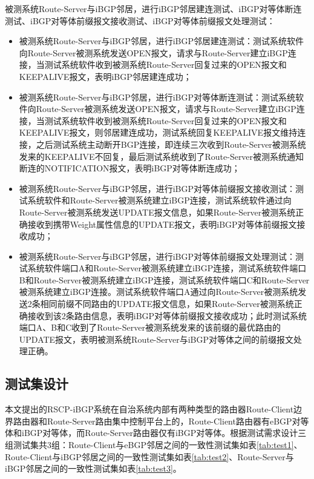 被测系统Route-Server与iBGP邻居，进行iBGP邻居建连测试、iBGP对等体断连测试、iBGP对等体前缀报文接收测试、iBGP对等体前缀报文处理测试：
\begin{itemize}
  \item 被测系统Route-Server与iBGP邻居，进行iBGP邻居建连测试：测试系统软件向Route-Server被测系统发送OPEN报文，请求与Route-Server建立iBGP连接，当测试系统软件收到被测系统Route-Server回复过来的OPEN报文和KEEPALIVE报文，表明iBGP邻居建连成功；
  \item 被测系统Route-Server与iBGP邻居，进行iBGP对等体断连测试：测试系统软件向Route-Server被测系统发送OPEN报文，请求与Route-Server建立iBGP连接，当测试系统软件收到被测系统Route-Server回复过来的OPEN报文和KEEPALIVE报文，则邻居建连成功，测试系统回复KEEPALIVE报文维持连接，之后测试系统主动断开BGP连接，即连续三次收到Route-Server被测系统发来的KEEPALIVE不回复，最后测试系统收到了Route-Server被测系统通知断连的NOTIFICATION报文，表明iBGP对等体断连成功；
  \item 被测系统Route-Server与iBGP邻居，进行iBGP对等体前缀报文接收测试：测试系统软件和Route-Server被测系统建立iBGP连接，测试系统软件通过向Route-Server被测系统发送UPDATE报文信息，如果Route-Server被测系统正确接收到携带Weight属性信息的UPDATE报文，表明iBGP对等体前缀报文接收成功；
  \item 被测系统Route-Server与iBGP邻居，进行iBGP对等体前缀报文处理测试：测试系统软件端口A和Route-Server被测系统建立iBGP连接，测试系统软件端口B和Route-Server被测系统建立iBGP连接，测试系统软件端口C和Route-Server被测系统建立iBGP连接。测试系统软件端口A通过向Route-Server被测系统发送2条相同前缀不同路由的UPDATE报文信息，如果Route-Server被测系统正确接收到该2条路由信息，表明iBGP对等体前缀报文接收成功；此时测试系统端口A、B和C收到了Route-Server被测系统发来的该前缀的最优路由的UPDATE报文，表明被测系统Route-Server与iBGP对等体之间的前缀报文处理正确。
\end{itemize}



\subsection{测试集设计}

本文提出的RSCP-iBGP系统在自治系统内部有两种类型的路由器Route-Client边界路由器和Route-Server路由集中控制平台上的，Route-Client路由器有eBGP对等体和iBGP对等体，而Route-Server路由器仅有iBGP对等体。根据测试需求设计三组测试集共3组：Route-Client与eBGP邻居之间的一致性测试集如表\ref{tab:test1}、Route-Client与iBGP邻居之间的一致性测试集如表\ref{tab:test2}、Route-Server与iBGP邻居之间的一致性测试集如表\ref{tab:test3}。



